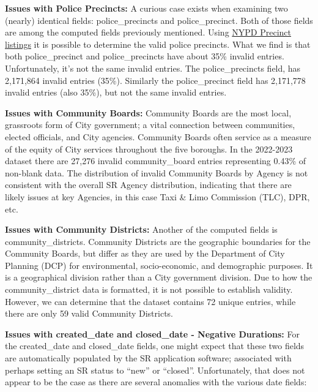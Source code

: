 \documentclass[12pt, titlepage]{article}
\begin{document}
\label{sec:police-precincts}
\textbf{Issues with Police Precincts:} A curious case exists when 
examining two (nearly) identical fields: police\_precincts and 
police\_precinct. Both of those fields are among the computed fields 
previously mentioned. Using 
\href{https://www.nyc.gov/site/nypd/bureaus/patrol/precincts-landing.page}
{NYPD Precinct listings} it is possible to determine the valid 
police precincts. What we find is that both police\_precinct 
and police\_precincts  have about 35\% invalid entries. Unfortunately, 
it's not the same invalid entries. The police\_precincts field, 
has 2,171,864 invalid entries (35\%). Similarly the 
police\_precinct field has 2,171,778 invalid entries 
(also 35\%), but not the same invalid entries. 


\label{sec:communityboards}
\textbf{Issues with Community Boards:} Community Boards are the most 
local, grassroots form of City government; a vital connection 
between communities, elected officials, and City agencies. Community 
Boards often service as a measure of the equity of City services 
throughout the five boroughs. In the 2022-2023 dataset there 
are 27,276 invalid community\_board entries representing 0.43\% 
of non-blank data. The distribution of invalid Community Boards 
by Agency is not consistent with the overall SR Agency distribution,
indicating that there are likely issues at key Agencies, in 
this case Taxi \& Limo Commission (TLC), DPR, etc. 


\label{sec:communitydistrict}
\textbf{Issues with Community Districts:} Another of the computed fields 
is community\_districts. Community Districts 
are the geographic boundaries for the Community Boards, but differ as they
are used by the Department of City Planning (DCP) for environmental, 
socio-economic, and demographic purposes. It is a geographical 
division rather than a City government division. Due to how the 
community\_district data is formatted, it is not possible to 
establish validity. However, we can determine that the dataset 
contains 72 unique entries, while there are only 59 
valid Community Districts. 
	

\label{sec:negativeduration}
\textbf{Issues with created\_date and closed\_date - Negative Durations:} For 
the created\_date and closed\_date fields, one might 
expect that these two fields are automatically populated by the 
SR application software; associated with perhaps setting an SR status 
to ``new'' or ``closed''. Unfortunately, that does not appear 
to be the case as there are several anomalies with the various date 
fields:
	
\end{document}

